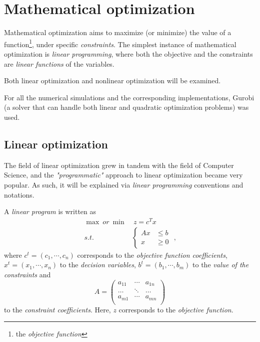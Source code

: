 \appendix
\section{Mathematical optimization} \label{sec:math-opt}
Mathematical optimization aims to maximize (or minimize) the value of a function\footnote{the \emph{objective
function}}, under specific \emph{constraints}. The simplest instance of mathematical optimization is
\emph{linear programming}, where both the objective and the constraints are \emph{linear functions} of the variables.

Both linear optimization and nonlinear optimization will be examined.

For all the numerical simulations and the corresponding implementations, Gurobi
\cite{gurobi} (a solver that can handle both linear and quadratic optimization
problems) was used.

\subsection{Linear optimization}

The field of linear optimization grew in tandem with the field of Computer
Science, and the \emph{"programmatic"} approach to linear optimization became
very popular. As such, it will be explained via \emph{linear programming}
conventions and notations.

A \emph{linear program} is written as
\begin{equation}
\begin{aligned}
    \max \ or\ \min & \ z = c^T x \\
    s.t. &
    \begin{cases}
    Ax & \leq b \\
    x & \geq 0
    \end{cases}\text{ ,}
\end{aligned} \label{eq:general-primal}
\end{equation}
where $c^t = ( c_1, \cdots, c_n )$ corresponds to the \emph{objective function
coefficients}, $x^t = (x_1, \cdots, x_n)$ to the \emph{decision variables}, $b^t
= (b_1, \cdots, b_m)$ to the \emph{value of the constraints} and
$$A =\begin{pmatrix}a_{11} & \cdots & a_{1n} \\ \hdots & \ddots & \hdots \\
a_{m1} & \cdots & a_{mn} \\ \end{pmatrix}$$ to the \emph{constraint
coefficients}. Here, $z$ corresponds to the \emph{objective function}.

